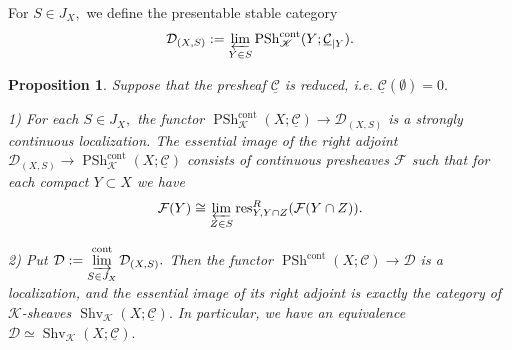 \documentclass[11pt,leqno]{amsart}
\newtheorem{prop}[theo]{Proposition}
\numberwithin{equation}{section}
\newcommand{\ms}[1]{\mathscr{#1}}
\newcommand{\msK}{\ms{K}}
\newcommand{\prolim}[1][]{\mathop{\varprojlim}\limits_{#1}}
\newcommand{\limproj}{\varprojlim}
\newcommand{\liminj}{\varinjlim}
\newcommand{\cont}{\operatorname{cont}}
\newcommand{\cF}{{\mathcal F}}
\newcommand{\cD}{{\mathcal D}}
\newcommand{\cC}{{\mathcal C}}
\newcommand{\un}{\underline}
\newcommand{\PSh}{\operatorname{PSh}}
\newcommand{\Sh}{\operatorname{Shv}}
\newcommand{\res}{\operatorname{res}}
\begin{document}
For $S\in J_X,$ we define the presentable stable category
$$\cD_{(X,S)}:=\prolim[Y\in S]\PSh^{\cont}_{\msK}(Y;\un{\cC}_{\mid Y}).$$

\begin{prop}\label{prop:approximating_sheaves} Suppose that the presheaf $\un{\cC}$ is reduced, i.e. $\un{\cC}(\emptyset)=0.$

1) For each $S\in J_X,$ the functor $\PSh^{\cont}_{\msK}(X;\un{\cC})\to \cD_{(X,S)}$ is a strongly continuous localization. The essential image of the right adjoint $\cD_{(X,S)}\to \PSh^{\cont}_{\msK}(X;\un{\cC})$ consists of continuous presheaves $\cF$ such that for each compact $Y\subset X$ we have
\begin{equation}\label{eq:description_of_D_X_S} \cF(Y)\cong \limproj\limits_{Z\in S}\res_{Y,Y\cap Z}^R(\cF(Y\cap Z)).\end{equation}

2) Put $\cD:=\liminj\limits_{S\in J_X}^{\cont}\cD_{(X,S)}.$ Then the functor $\PSh^{\cont}(X;\cC)\to\cD$ is a localization, and the essential image of its right adjoint is exactly the category of $\msK$-sheaves $\Sh_{\msK}(X;\un{\cC}).$ In particular, we have an equivalence $\cD\simeq \Sh_{\msK}(X;\un{\cC}).$\end{prop} 
\end{document}
